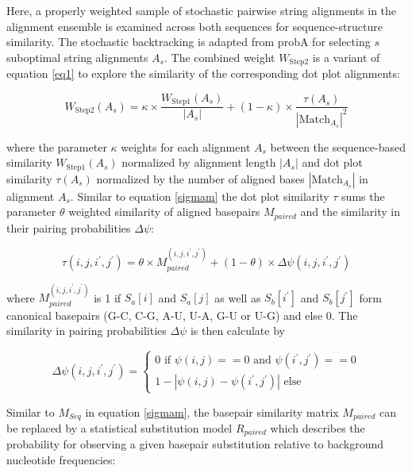 \documentclass[a4paper,11pt]{article}
\begin{document}
Here, a properly weighted sample of stochastic pairwise string alignments
in the alignment ensemble is examined across both sequences for sequence-structure similarity.
The stochastic backtracking is adapted from probA \cite{muckstein2006} for
selecting $s$ suboptimal string alignments $A_s$.  The combined weight
$W_{\mbox{Step2}}$ is a variant of equation \ref{eq1} to explore the similarity
of the corresponding dot plot alignments:

\begin{equation}\label{eq7}
	W_{\mbox{Step2}}(A_s) = \kappa \times \frac{W_{\mbox{Step1}}(A_s)}{|A_s|} + (1-\kappa) \times
	\frac{\tau(A_s)}{{|\mbox{Match}_{A_s}|}^2}
\end{equation}

\noindent where the parameter $\kappa$ weights for each alignment $A_s$ between the
sequence-based similarity $W_{\mbox{Step1}}(A_s)$ normalized by alignment
length $|A_s|$ and dot plot similarity $\tau(A_s)$ normalized by the number of
aligned bases $|\mbox{Match}_{A_s}|$ in alignment $A_s$. Similar to equation
\ref{sigmam} the dot plot similarity $\tau$ sums the parameter $\theta$ weighted
similarity of aligned basepairs $M_{paired}$ and the similarity in their
pairing probabilities $\Delta \psi$:

\begin{equation}\label{eq8}
	\tau(i,j,i^\prime,j^\prime) = \theta \times M_{paired}^{(i,j,i^\prime,j^\prime)}
	+ (1-\theta) \times \Delta \psi(i,j,i^\prime,j^\prime)
\end{equation}

\noindent where $M_{paired}^{(i,j,i^\prime,j^\prime)}$ is 1 if $S_a[i]$ and $S_a[j]$ as
well as $S_b[i^\prime]$ and $S_b[j^\prime]$ form canonical basepairs (G-C, C-G,
A-U, U-A, G-U or U-G) and else 0. The similarity in pairing probabilities
$\Delta \psi$ is then calculate by

\begin{equation}\label{eq9}
	\Delta \psi(i,j,i^\prime,j^\prime) = \left\{ \begin{array}{l}
			0 \textrm{ if }\psi(i,j) == 0 
			  \textrm{ and }\psi(i^\prime,j^\prime) == 0 \\
		1 - | \psi(i,j) - \psi(i^\prime,j^\prime) | \textrm{ else}
		\end{array}\right.
\end{equation}

\noindent Similar to $M_{Seq}$ in equation \ref{sigmam}, the basepair similarity matrix
$M_{paired}$ can be replaced by a statistical substitution model $R_{paired}$
which describes the probability for observing a given basepair substitution
relative to background nucleotide frequencies:
\end{document}
